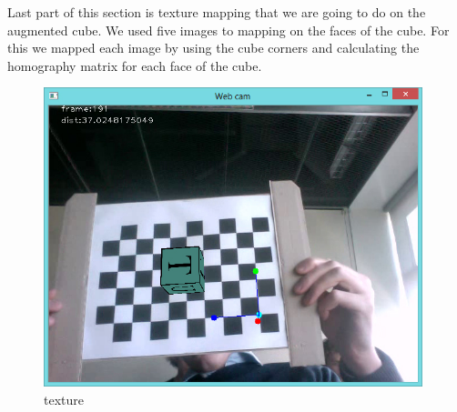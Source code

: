 Last part of this section is texture mapping that we are going to do on the augmented cube. We used five images to mapping on the faces of the cube. For this we mapped each image by using the cube corners and calculating the homography matrix for each face of the cube.

 \begin{figure}[h!]
	\centering
	\includegraphics[width=11cm]{Handin3/images/texture.jpg}
	\caption{texture}
	\label{fig:texture}
\end{figure}
